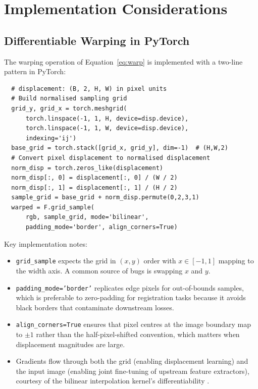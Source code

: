 \section{Implementation Considerations}
\label{sec:implementation}

\subsection{Differentiable Warping in PyTorch}
\label{subsec:grid_sample}

The warping operation of Equation~\eqref{eq:warp} is implemented with a
two-line pattern in PyTorch:

\begin{verbatim}
  # displacement: (B, 2, H, W) in pixel units
  # Build normalised sampling grid
  grid_y, grid_x = torch.meshgrid(
      torch.linspace(-1, 1, H, device=disp.device),
      torch.linspace(-1, 1, W, device=disp.device),
      indexing='ij')
  base_grid = torch.stack([grid_x, grid_y], dim=-1)  # (H,W,2)
  # Convert pixel displacement to normalised displacement
  norm_disp = torch.zeros_like(displacement)
  norm_disp[:, 0] = displacement[:, 0] / (W / 2)
  norm_disp[:, 1] = displacement[:, 1] / (H / 2)
  sample_grid = base_grid + norm_disp.permute(0,2,3,1)
  warped = F.grid_sample(
      rgb, sample_grid, mode='bilinear',
      padding_mode='border', align_corners=True)
\end{verbatim}

Key implementation notes:
\begin{itemize}
  \item \texttt{grid\_sample} expects the grid in $(x,y)$ order with
        $x \in [-1,1]$ mapping to the width axis.  A common source of
        bugs is swapping $x$ and $y$.
  \item \texttt{padding\_mode='border'} replicates edge pixels for
        out-of-bounds samples, which is preferable to zero-padding for
        registration tasks because it avoids black borders that
        contaminate downstream losses.
  \item \texttt{align\_corners=True} ensures that pixel centres at the
        image boundary map to $\pm 1$ rather than the half-pixel-shifted
        convention, which matters when displacement magnitudes are large.
  \item Gradients flow through both the grid (enabling displacement
        learning) and the input image (enabling joint fine-tuning of
        upstream feature extractors), courtesy of the bilinear
        interpolation kernel's differentiability \cite{jaderberg2015spatial}.
\end{itemize}


